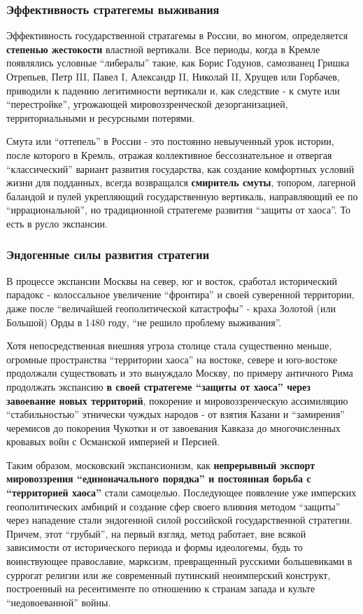 \subsubsection{Эффективность стратегемы выживания}

Эффективность государственной стратагемы в России, во многом, определяется
\textbf{степенью жестокости} властной вертикали. Все периоды, когда в Кремле появлялись
условные \enquote{либералы} такие, как Борис Годунов, самозванец Гришка Отрепьев, Петр
III, Павел I, Александр II, Николай II, Хрущев или Горбачев, приводили к
падению легитимности вертикали и, как следствие - к смуте или \enquote{перестройке},
угрожающей мировоззренческой дезорганизацией, территориальными и ресурсными
потерями.

Смута или \enquote{оттепель} в России - это постоянно невыученный урок истории, после
которого в Кремль, отражая коллективное бессознательное и отвергая
\enquote{классический} вариант развития государства, как создание комфортных условий
жизни для подданных, всегда возвращался \textbf{смиритель смуты}, топором, лагерной
баландой и пулей укрепляющий государственную вертикаль, направляющий ее по
\enquote{иррациональной}, но традиционной стратегеме развития \enquote{защиты от хаоса}. То
есть в русло экспансии.

\subsubsection{Эндогенные силы развития стратегии}

В процессе экспансии Москвы на север, юг и восток, сработал исторический
парадокс - колоссальное увеличение \enquote{фронтира} и своей суверенной территории,
даже после \enquote{величайшей геополитической катастрофы} - краха Золотой (или
Большой) Орды в 1480 году, \enquote{не решило проблему выживания}.

Хотя непосредственная внешняя угроза столице стала существенно меньше, огромные
пространства \enquote{территории хаоса} на востоке, севере и юго-востоке продолжали
существовать и это вынуждало Москву, по примеру античного Рима продолжать
экспансию \textbf{в своей стратегеме \enquote{защиты от хаоса} через завоевание новых
территорий}, покорение и мировоззренческую ассимиляцию \enquote{стабильностью} этнически
чуждых народов - от взятия Казани и \enquote{замирения} черемисов до покорения Чукотки
и от завоевания Кавказа до многочисленных кровавых войн с Османской империей и
Персией.

Таким образом, московский экспансионизм, как \textbf{непрерывный экспорт мировоззрения
\enquote{единоначального порядка} и постоянная борьба с \enquote{территорией хаоса}} стали
самоцелью. Последующее появление уже имперских геополитических амбиций и
создание сфер своего влияния методом \enquote{защиты} через нападение стали эндогенной
силой российской государственной стратегии. Причем, этот \enquote{грубый}, на первый
взгляд, метод работает, вне всякой зависимости от исторического периода и формы
идеологемы, будь то воинствующее православие, марксизм, превращенный русскими
большевиками в суррогат религии или же современный путинский неоимперский
конструкт, построенный на ресентименте по отношению к странам запада и культе
\enquote{недовоеванной} войны.

